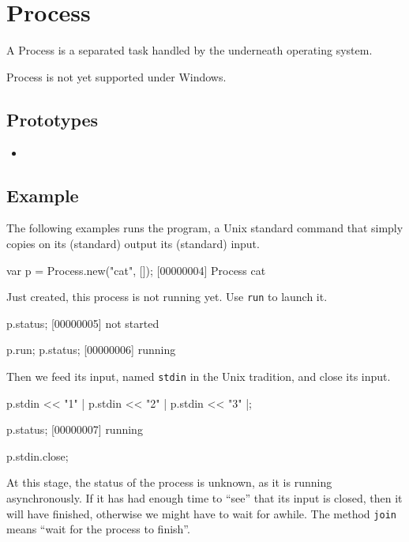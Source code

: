 \section{Process}

A Process is a separated task handled by the underneath operating
system.

\begin{windows}
  Process is not yet supported under Windows.
\end{windows}

\subsection{Prototypes}
\begin{itemize}
\item {}
\end{itemize}

\subsection{Example}

The following examples runs the  program, a Unix standard
command that simply copies on its (standard) output its (standard)
input.

\begin{urbiscript}
var p = Process.new("cat", []);
[00000004] Process cat
\end{urbiscript}

\noindent
Just created, this process is not running yet.  Use \lstinline|run| to
launch it.

\begin{urbiscript}
p.status;
[00000005] not started

p.run;
p.status;
[00000006] running
\end{urbiscript}

\noindent
Then we feed its input, named \lstinline|stdin| in the Unix
tradition, and close its input.

\begin{urbiscript}
p.stdin << "1\n" |
p.stdin << "2\n" |
p.stdin << "3\n" |;

p.status;
[00000007] running

p.stdin.close;
\end{urbiscript}

\noindent
At this stage, the status of the process is unknown, as it is running
asynchronously.  If it has had enough time to ``see'' that its input
is closed, then it will have finished, otherwise we might have to wait
for awhile.  The method \lstinline|join| means ``wait for the process
to finish''.


